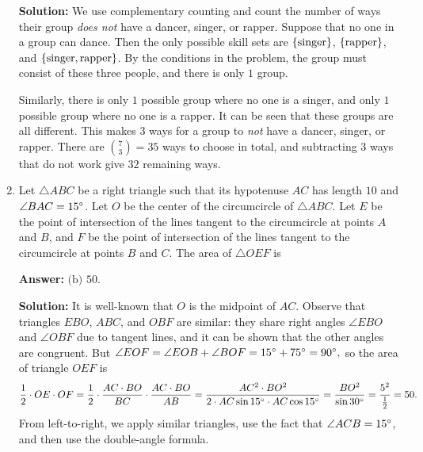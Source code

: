 \documentclass[11pt,paper=letter]{scrartcl}
\begin{document}
\begin{enumerate}[left=0pt]
\textbf{Solution:} We use complementary counting and count the number of ways their group \emph{does not} have a dancer, singer, or rapper. Suppose that no one in a group can dance. Then the only possible skill sets are $\left\{ \text{singer} \right\}$, $\left\{ \text{rapper} \right\}$, and $\left\{ \text{singer}, \text{rapper} \right\}$. By the conditions in the problem, the group must consist of these three people, and there is only $1$ group.

Similarly, there is only $1$ possible group where no one is a singer, and only $1$ possible group where no one is a rapper. It can be seen that these groups are all different. This makes $3$ ways for a group to \emph{not} have a dancer, singer, or rapper. There are $\binom73 = 35$ ways to choose in total, and subtracting $3$ ways that do not work give $32$ remaining ways.

\item Let $\triangle ABC$ be a right triangle such that its hypotenuse $AC$ has length $10$ and $\angle BAC = 15^\circ$. Let $O$ be the center of the circumcircle of $\triangle ABC$. Let $E$ be the point of intersection of the lines tangent to the circumcircle at points $A$ and $B$, and $F$ be the point of intersection of the lines tangent to the circumcircle at points $B$ and $C$. The area of $\triangle OEF$ is


\textbf{Answer:} $\boxed{\text{(b) }50}$.

\begin{center}
\end{center}
\textbf{Solution:} It is well-known that $O$ is the midpoint of $AC$. Observe that triangles $EBO$, $ABC$, and $OBF$ are similar: they share right angles $\angle EBO$ and $\angle OBF$ due to tangent lines, and it can be shown that the other angles are congruent. But $\angle EOF = \angle EOB + \angle BOF = 15^\circ + 75^\circ = 90^\circ,$ so the area of triangle $OEF$ is $$
\frac12 \cdot OE \cdot OF = \frac12 \cdot \frac{AC\cdot BO}{BC} \cdot \frac{AC \cdot BO}{AB} = \frac{AC^2 \cdot BO^2}{2 \cdot AC \sin 15^\circ \cdot AC \cos 15^\circ} = \frac{BO^2}{\sin 30^\circ} = \frac{5^2}{\frac12} = 50.
$$
From left-to-right, we apply similar triangles, use the fact that $\angle ACB = 15^\circ$, and then use the double-angle formula. 


\end{enumerate}
\end{document}
